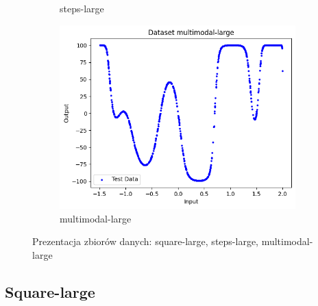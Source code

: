 \documentclass{article}
\begin{document}
\begin{figure}[H]
\begin{subfigure}[b]{0.3\textwidth}
        \caption{steps-large}
    \end{subfigure}
    \hfill
    \begin{subfigure}[b]{0.3\textwidth}
        \centering
        \includegraphics[width=\textwidth]{img/nn3/multimodal-large.png}
        \caption{multimodal-large}
    \end{subfigure}
    \caption{Prezentacja zbiorów danych: square-large, steps-large, multimodal-large}
\end{figure}

\subsection*{Square-large}
\end{document}
